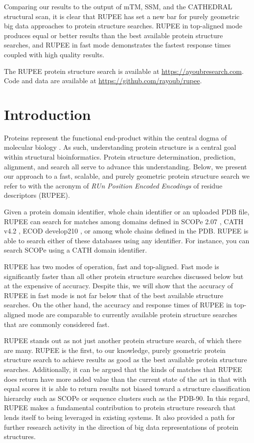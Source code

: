 \documentclass[10pt,letterpaper]{article}
\begin{document}
Comparing our results to the output of mTM, SSM, and the CATHEDRAL structural scan, it is clear that RUPEE has set a new bar for purely geometric big data approaches to protein structure searches.
RUPEE in top-aligned mode produces equal or better results than the best available protein structure searches, and RUPEE in fast mode demonstrates the fastest response times coupled with high quality results. 

The RUPEE protein structure search is available at \url{https://ayoubresearch.com}. 
Code and data are available at \url{https://github.com/rayoub/rupee}.

\linenumbers

\section*{Introduction}

Proteins represent the functional end-product within the central dogma of molecular biology \cite{Crick1970}.
As such, understanding protein structure is a central goal within structural bioinformatics. 
Protein structure determination, prediction, alignment, and search all serve to advance this understanding. 
Below, we present our approach to a fast, scalable, and purely geometric protein structure search we refer to with the acronym of \emph{RUn Position Encoded Encodings} of residue descriptors (RUPEE).

Given a protein domain identifier, whole chain identifier or an uploaded PDB file, RUPEE can search for matches among domains defined in SCOPe 2.07 \cite{Fox2013}, CATH v4.2 \cite{Orengo1997}, ECOD develop210 \cite{Cheng2014}, or among whole chains defined in the PDB.
RUPEE is able to search either of these databases using any identifier. 
For instance, you can search SCOPe using a CATH domain identifier. 

RUPEE has two modes of operation, fast and top-aligned. 
Fast mode is significantly faster than all other protein structure searches discussed below but at the expensive of accuracy.
Despite this, we will show that the accuracy of RUPEE in fast mode is not far below that of the best available structure searches. 
On the other hand, the accuracy and response times of RUPEE in top-aligned mode are comparable to currently available protein structure searches that are commonly considered fast. 

RUPEE stands out as not just another protein structure search, of which there are many. 
RUPEE is the first, to our knowledge, purely geometric protein structure search to achieve results as good as the best available protein structure searches. 
Additionally, it can be argued that the kinds of matches that RUPEE does return have more added value than the current state of the art in that with equal scores it is able to return results not biased toward a structure classification hierarchy such as SCOPe or sequence clusters such as the PDB-90. 
In this regard, RUPEE makes a fundamental contribution to protein structure research that lends itself to being leveraged in existing systems. 
It also provided a path for further research activity in the direction of big data representations of protein structures. 
\end{document}
